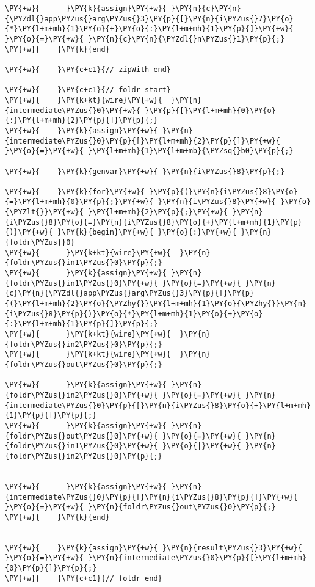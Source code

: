 {\begin{Verbatim}[commandchars=\\\{\}]
\PY{+w}{      }\PY{k}{assign}\PY{+w}{ }\PY{n}{c}\PY{n}{\PYZdl{}app\PYZus{}arg\PYZus{}3}\PY{p}{[}\PY{n}{i\PYZus{}7}\PY{o}{*}\PY{l+m+mh}{1}\PY{o}{+}\PY{o}{:}\PY{l+m+mh}{1}\PY{p}{]}\PY{+w}{ }\PY{o}{=}\PY{+w}{ }\PY{n}{c}\PY{n}{\PYZdl{}n\PYZus{}1}\PY{p}{;}
\PY{+w}{    }\PY{k}{end}

\PY{+w}{    }\PY{c+c1}{// zipWith end}

\PY{+w}{    }\PY{c+c1}{// foldr start}
\PY{+w}{    }\PY{k+kt}{wire}\PY{+w}{  }\PY{n}{intermediate\PYZus{}0}\PY{+w}{ }\PY{p}{[}\PY{l+m+mh}{0}\PY{o}{:}\PY{l+m+mh}{2}\PY{p}{]}\PY{p}{;}
\PY{+w}{    }\PY{k}{assign}\PY{+w}{ }\PY{n}{intermediate\PYZus{}0}\PY{p}{[}\PY{l+m+mh}{2}\PY{p}{]}\PY{+w}{ }\PY{o}{=}\PY{+w}{ }\PY{l+m+mh}{1}\PY{l+m+mb}{\PYZsq{}b0}\PY{p}{;}

\PY{+w}{    }\PY{k}{genvar}\PY{+w}{ }\PY{n}{i\PYZus{}8}\PY{p}{;}

\PY{+w}{    }\PY{k}{for}\PY{+w}{ }\PY{p}{(}\PY{n}{i\PYZus{}8}\PY{o}{=}\PY{l+m+mh}{0}\PY{p}{;}\PY{+w}{ }\PY{n}{i\PYZus{}8}\PY{+w}{ }\PY{o}{\PYZlt{}}\PY{+w}{ }\PY{l+m+mh}{2}\PY{p}{;}\PY{+w}{ }\PY{n}{i\PYZus{}8}\PY{o}{=}\PY{n}{i\PYZus{}8}\PY{o}{+}\PY{l+m+mh}{1}\PY{p}{)}\PY{+w}{ }\PY{k}{begin}\PY{+w}{ }\PY{o}{:}\PY{+w}{ }\PY{n}{foldr\PYZus{}0}
\PY{+w}{      }\PY{k+kt}{wire}\PY{+w}{  }\PY{n}{foldr\PYZus{}in1\PYZus{}0}\PY{p}{;}
\PY{+w}{      }\PY{k}{assign}\PY{+w}{ }\PY{n}{foldr\PYZus{}in1\PYZus{}0}\PY{+w}{ }\PY{o}{=}\PY{+w}{ }\PY{n}{c}\PY{n}{\PYZdl{}app\PYZus{}arg\PYZus{}3}\PY{p}{[}\PY{p}{(}\PY{l+m+mh}{2}\PY{o}{\PYZhy{}}\PY{l+m+mh}{1}\PY{o}{\PYZhy{}}\PY{n}{i\PYZus{}8}\PY{p}{)}\PY{o}{*}\PY{l+m+mh}{1}\PY{o}{+}\PY{o}{:}\PY{l+m+mh}{1}\PY{p}{]}\PY{p}{;}
\PY{+w}{      }\PY{k+kt}{wire}\PY{+w}{  }\PY{n}{foldr\PYZus{}in2\PYZus{}0}\PY{p}{;}
\PY{+w}{      }\PY{k+kt}{wire}\PY{+w}{  }\PY{n}{foldr\PYZus{}out\PYZus{}0}\PY{p}{;}

\PY{+w}{      }\PY{k}{assign}\PY{+w}{ }\PY{n}{foldr\PYZus{}in2\PYZus{}0}\PY{+w}{ }\PY{o}{=}\PY{+w}{ }\PY{n}{intermediate\PYZus{}0}\PY{p}{[}\PY{n}{i\PYZus{}8}\PY{o}{+}\PY{l+m+mh}{1}\PY{p}{]}\PY{p}{;}
\PY{+w}{      }\PY{k}{assign}\PY{+w}{ }\PY{n}{foldr\PYZus{}out\PYZus{}0}\PY{+w}{ }\PY{o}{=}\PY{+w}{ }\PY{n}{foldr\PYZus{}in1\PYZus{}0}\PY{+w}{ }\PY{o}{|}\PY{+w}{ }\PY{n}{foldr\PYZus{}in2\PYZus{}0}\PY{p}{;}


\PY{+w}{      }\PY{k}{assign}\PY{+w}{ }\PY{n}{intermediate\PYZus{}0}\PY{p}{[}\PY{n}{i\PYZus{}8}\PY{p}{]}\PY{+w}{ }\PY{o}{=}\PY{+w}{ }\PY{n}{foldr\PYZus{}out\PYZus{}0}\PY{p}{;}
\PY{+w}{    }\PY{k}{end}


\PY{+w}{    }\PY{k}{assign}\PY{+w}{ }\PY{n}{result\PYZus{}3}\PY{+w}{ }\PY{o}{=}\PY{+w}{ }\PY{n}{intermediate\PYZus{}0}\PY{p}{[}\PY{l+m+mh}{0}\PY{p}{]}\PY{p}{;}
\PY{+w}{    }\PY{c+c1}{// foldr end}



\end{Verbatim}}
